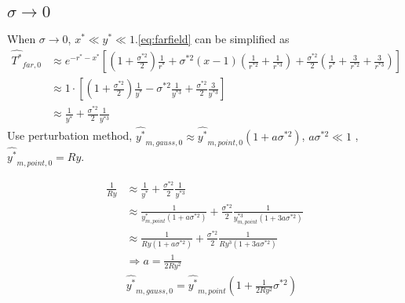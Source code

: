\documentclass[review, 1p, number, sort&compress,table]{elsarticle}
\begin{document}
	\subsection{$\sigma\rightarrow{0}$}
	When $\sigma\rightarrow{0}$, $x^{*} \ll y^{*}\ll 1$.\autoref{eq:farfield} can be simplified as
		\begin{align}  \label{eq:farfield.01}
		\nonumber
		\widehat{T^*}_{far,0}
		&\approx e^{-r^{*}-x^{*}}\left[ \left(1+\frac{\sigma^{*2}}{2} \right)  \frac{1}{r^{*}} +\sigma^{*2}\left(x-1\right) \left(\frac{1}{r^{*2}}+\frac{1}{r^{*3}}\right)
		+\frac{\sigma^{*2}}{2}\left(\frac{1}{r^{*}}+\frac{3}{r^{*2}} +\frac{3}{r^{*3}}\right)\right]
		\\ \nonumber
		&\approx 1\cdot \left[ \left(1+\frac{\sigma^{*2}}{2} \right)  \frac{1}{y^{*}}-\sigma^{*2}\frac{1}{y^{*3}}
		+\frac{\sigma^{*2}}{2}\frac{3}{y^{*3}}\right]
		\\ \nonumber
		&\approx  \frac{1}{y^{*}}+\frac{\sigma^{*2}}{2}\frac{1}{y^{*3}}
		\end{align} 
		Use perturbation method, $\widehat{y^*}_{m,gauss,0} \approx \widehat{y^*}_{m,point,0}\left(1+a\sigma^{*2}\right)$, $a\sigma^{*2}\ll1$ ,	$\widehat{y^*}_{m,point,0} = Ry$.
		
		\begin{align}  
		\nonumber
		\frac{1}{Ry}
		& \approx  \frac{1}{y^{*}}+\frac{\sigma^{*2}}{2}\frac{1}{y^{*3}}
		\\ \nonumber
		&\approx\frac{1}{y^*_{m,point}\left(1+a\sigma^{*2}\right)}+\frac{\sigma^{*2}}{2}\frac{1}{y^{*3}_{m,point}\left(1+3a\sigma^{*2}\right)}
		\\ \nonumber 
		&\approx \frac{1}{Ry\left(1+a\sigma^{*2}\right)}+\frac{\sigma^{*2}}{2}\frac{1}{Ry^{3}\left(1+3a\sigma^{*2}\right)}
		\\
		& \Rightarrow a=\frac{1}{2Ry^{2}}  
		\\
		& \widehat{y^*}_{m,gauss,0}=\widehat{y^*}_{m,point}\left(1+\frac{1}{2Ry^{2}}\sigma^{*2}\right)
		\end{align} 
		
\end{document}

